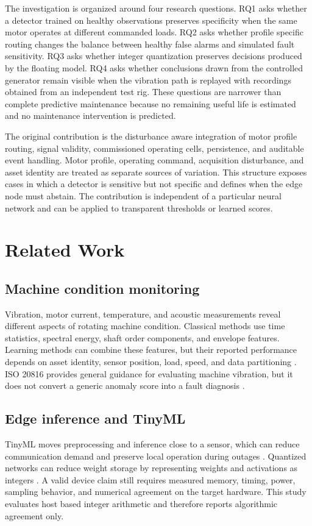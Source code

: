 \documentclass[10pt,twocolumn]{article}
\begin{document}
The investigation is organized around four research questions. RQ1 asks whether a detector trained on healthy observations preserves specificity when the same motor operates at different commanded loads. RQ2 asks whether profile specific routing changes the balance between healthy false alarms and simulated fault sensitivity. RQ3 asks whether integer quantization preserves decisions produced by the floating model. RQ4 asks whether conclusions drawn from the controlled generator remain visible when the vibration path is replayed with recordings obtained from an independent test rig. These questions are narrower than complete predictive maintenance because no remaining useful life is estimated and no maintenance intervention is predicted.

The original contribution is the disturbance aware integration of motor profile routing, signal validity, commissioned operating cells, persistence, and auditable event handling. Motor profile, operating command, acquisition disturbance, and asset identity are treated as separate sources of variation. This structure exposes cases in which a detector is sensitive but not specific and defines when the edge node must abstain. The contribution is independent of a particular neural network and can be applied to transparent thresholds or learned scores.

\section{Related Work}
\subsection{Machine condition monitoring}
Vibration, motor current, temperature, and acoustic measurements reveal different aspects of rotating machine condition. Classical methods use time statistics, spectral energy, shaft order components, and envelope features. Learning methods can combine these features, but their reported performance depends on asset identity, sensor position, load, speed, and data partitioning \cite{lei2020,wheat2024}. ISO 20816 provides general guidance for evaluating machine vibration, but it does not convert a generic anomaly score into a fault diagnosis \cite{iso20816}.

\subsection{Edge inference and TinyML}
TinyML moves preprocessing and inference close to a sensor, which can reduce communication demand and preserve local operation during outages \cite{warden2019}. Quantized networks can reduce weight storage by representing weights and activations as integers \cite{jacob2018}. A valid device claim still requires measured memory, timing, power, sampling behavior, and numerical agreement on the target hardware. This study evaluates host based integer arithmetic and therefore reports algorithmic agreement only.
\end{document}
